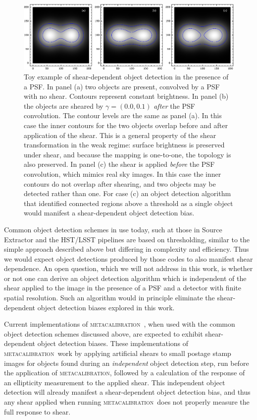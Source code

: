 \documentclass[fleqn,useAMS,usenatbib]{mnras}
\newcommand{\mcal}{\textsc{metacalibration}}
\begin{document}
\begin{figure}
  \includegraphics[width=\textwidth]{figures/toy.png}

  \caption{ Toy example of shear-dependent object detection in the presence of
    a PSF.  In panel (a) two objects are present, convolved by a PSF with no
    shear.  Contours represent constant brightness.  In panel (b) the objects
    are sheared by $\gamma = (0.0, 0.1)$ {\em after} the PSF convolution.  The
    contour levels are the same as panel (a).  In this case the inner contours
    for the two objects overlap before and after application of the shear. This
    is a general property of the shear transformation in the weak regime:
    surface brightness is preserved under shear, and because the mapping is
    one-to-one, the topology is also preserved. In panel (c) the shear is
    applied {\em before} the PSF convolution, which mimics real sky images. In
    this case the inner contours do not overlap after shearing, and two objects
    may be detected rather than one.  For case (c) an object detection
    algorithm that identified connected regions above a threshold as a single
    object would manifest a shear-dependent object detection bias.
    \label{fig:toy} }

\end{figure}

Common object detection schemes in use today, such at those in Source Extractor
\citep{Bertin96} and the HST/LSST pipelines \citep{BoschHSC2018,BoschLSST2018}
are based on thresholding, similar to the simple approach described above but
differing in complexity and efficiency. Thus we would expect object detections
produced by those codes to also manifest shear dependence. An open question,
which we will not address in this work, is whether or not one can derive an
object detection algorithm which is independent of the shear applied to the
image in the presence of a PSF and a detector with finite spatial resolution.
Such an algorithm would in principle eliminate the shear-dependent object
detection biases explored in this work.

Current implementations of \mcal\
\citep[e.g.,][]{HuffMcal2017,SheldonMcal2017}, when used with the common object
detection schemes discussed above, are expected to exhibit shear-dependent
object detection biases. These implementations of \mcal\ work by applying
artificial shears to small postage stamp images for objects found during an
{\em independent} object detection step, run before the application of \mcal,
followed by a calculation of the response of an ellipticity measurement to the
applied shear. This independent object detection will already manifest a
shear-dependent object detection bias, and thus any shear applied when running
\mcal\ does not properly measure the full response to shear.
\end{document}
